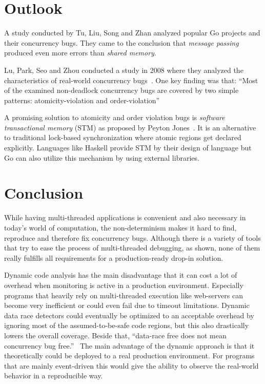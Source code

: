 \documentclass[conference]{IEEEtran}
\begin{document}
\section{Outlook}
\label{sct:outlook}
A study conducted by Tu, Liu, Song and Zhan analyzed popular Go projects and their concurrency bugs.
They came to the conclusion that \emph{message passing} produced even more errors than \emph{shared memory}.

Lu, Park, Seo and Zhou conducted a study in 2008 where they analyzed the characteristics of real-world concurrency bugs~\cite{lu2008mistakes}.
One key finding was that:
``Most of the examined non-deadlock concurrency bugs are covered by two simple patterns: atomicity-violation and order-violation''~\cite{lu2008mistakes}

A promising solution to atomicity and order violation bugs is \emph{software transactional memory} (STM) as proposed by Peyton Jones~\cite{peytonjones2007beautiful}.
It is an alternative to traditional lock-based synchronization where atomic regions get declared explicitly.
Languages like Haskell provide STM by their design of language but Go can also utilize this mechanism by using external libraries.

\section{Conclusion}
\label{sct:conclusion}

While having multi-threaded applications is convenient and also necessary in today's world of computation, the non-determinism makes it hard to find, reproduce and therefore fix concurrency bugs.
Although there is a variety of tools that try to ease the process of multi-threaded debugging, as shown, none of them really fulfills all requirements for a production-ready drop-in solution.

Dynamic code analysis has the main disadvantage that it can cost a lot of overhead when monitoring is active in a production environment.
Especially programs that heavily rely on multi-threaded execution like web-servers  can become very inefficient or could even fail due to timeout limitations.
Dynamic data race detectors could eventually be optimized to an acceptable overhead by ignoring most of the assumed-to-be-safe code regions, but this also drastically lowers the overall coverage.
Beside that, ``data-race free does not mean concurrency bug free.''~\cite{lu2008mistakes}
The main advantage of the dynamic approach is that it theoretically could be deployed to a real production environment.
For programs that are mainly event-driven this would give the ability to observe the real-world behavior in a reproducible way.
\end{document}
